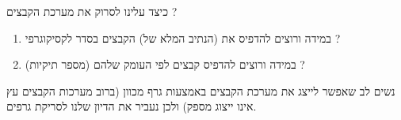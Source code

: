 כיצד עלינו לסרוק את מערכת הקבצים ? 
\begin{enumerate}
\item
במידה ורוצים להדפיס את (הנתיב המלא של) הקבצים בסדר לקסיקוגרפי ?
\item
במידה ורוצים להדפיס קבצים לפי העומק שלהם (מספר תיקיות) ?
\end{enumerate}
נשים לב שאפשר לייצג את מערכת הקבצים באמצעות גרף מכוון (ברוב מערכות הקבצים עץ אינו ייצוג מספק)
ולכן נעביר את הדיון שלנו לסריקת גרפים.

